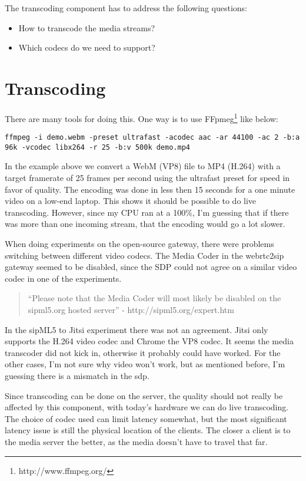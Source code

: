 The transcoding component has to address the following questions:

\begin{itemize}
\item{How to transcode the media streams?}
\item{Which codecs do we need to support?}
\end{itemize}

\section{Transcoding}
There are many tools for doing this. One way is to use FFpmeg\footnote{http://www.ffmpeg.org/} like below:

\begin{lstlisting}
ffmpeg -i demo.webm -preset ultrafast -acodec aac -ar 44100 -ac 2 -b:a 96k -vcodec libx264 -r 25 -b:v 500k demo.mp4
\end{lstlisting}

In the example above we convert a WebM (VP8) file to MP4 (H.264) with a target framerate of 25 frames per second using the ultrafast preset for speed in favor of quality. The encoding was done in less then 15 seconds for a one minute video on a low-end laptop. This shows it should be possible to do live transcoding. However, since my CPU ran at a 100\%, I'm guessing that if there was more than one incoming stream, that the encoding would go a lot slower.

When doing experiments on the open-source gateway, there were problems switching between different video codecs. The Media Coder in the webrtc2sip gateway seemed to be disabled, since the SDP could not agree on a similar video codec in one of the experiments.

\begin{quote}
``Please note that the Media Coder will most likely be disabled on the sipml5.org hosted server'' - http://sipml5.org/expert.htm
\end{quote}

In the sipML5 to Jitsi experiment there was not an agreement. Jitsi only supports the H.264 video codec and Chrome the VP8 codec. It seems the media transcoder did not kick in, otherwise it probably could have worked. For the other cases, I'm not sure why video won't work, but as mentioned before, I'm guessing there is a mismatch in the \gls{sdp}.

Since transcoding can be done on the server, the quality should not really be affected by this component, with today's hardware we can do live transcoding. The choice of codec used can limit latency somewhat, but the most significant latency issue is still the physical location of the clients. The closer a client is to the media server the better, as the media doesn't have to travel that far.

